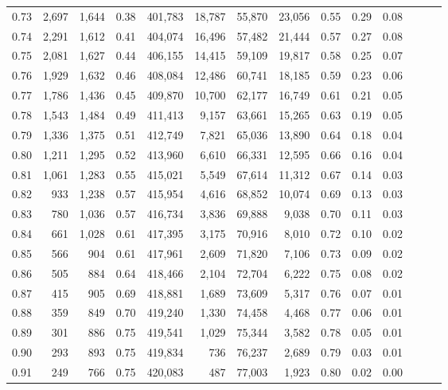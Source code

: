 \begin{tabular}{rrrrrrrrrrrrrr}
0.73 &  2,697 &  1,644 &  0.38 &  401,783 &   18,787 &  55,870 &  23,056 &  0.55 &  0.29 &      0.08 \\
0.74 &  2,291 &  1,612 &  0.41 &  404,074 &   16,496 &  57,482 &  21,444 &  0.57 &  0.27 &      0.08 \\
0.75 &  2,081 &  1,627 &  0.44 &  406,155 &   14,415 &  59,109 &  19,817 &  0.58 &  0.25 &      0.07 \\
0.76 &  1,929 &  1,632 &  0.46 &  408,084 &   12,486 &  60,741 &  18,185 &  0.59 &  0.23 &      0.06 \\
0.77 &  1,786 &  1,436 &  0.45 &  409,870 &   10,700 &  62,177 &  16,749 &  0.61 &  0.21 &      0.05 \\
0.78 &  1,543 &  1,484 &  0.49 &  411,413 &    9,157 &  63,661 &  15,265 &  0.63 &  0.19 &      0.05 \\
0.79 &  1,336 &  1,375 &  0.51 &  412,749 &    7,821 &  65,036 &  13,890 &  0.64 &  0.18 &      0.04 \\
0.80 &  1,211 &  1,295 &  0.52 &  413,960 &    6,610 &  66,331 &  12,595 &  0.66 &  0.16 &      0.04 \\
0.81 &  1,061 &  1,283 &  0.55 &  415,021 &    5,549 &  67,614 &  11,312 &  0.67 &  0.14 &      0.03 \\
0.82 &    933 &  1,238 &  0.57 &  415,954 &    4,616 &  68,852 &  10,074 &  0.69 &  0.13 &      0.03 \\
0.83 &    780 &  1,036 &  0.57 &  416,734 &    3,836 &  69,888 &   9,038 &  0.70 &  0.11 &      0.03 \\
0.84 &    661 &  1,028 &  0.61 &  417,395 &    3,175 &  70,916 &   8,010 &  0.72 &  0.10 &      0.02 \\
0.85 &    566 &    904 &  0.61 &  417,961 &    2,609 &  71,820 &   7,106 &  0.73 &  0.09 &      0.02 \\
0.86 &    505 &    884 &  0.64 &  418,466 &    2,104 &  72,704 &   6,222 &  0.75 &  0.08 &      0.02 \\
0.87 &    415 &    905 &  0.69 &  418,881 &    1,689 &  73,609 &   5,317 &  0.76 &  0.07 &      0.01 \\
0.88 &    359 &    849 &  0.70 &  419,240 &    1,330 &  74,458 &   4,468 &  0.77 &  0.06 &      0.01 \\
0.89 &    301 &    886 &  0.75 &  419,541 &    1,029 &  75,344 &   3,582 &  0.78 &  0.05 &      0.01 \\
0.90 &    293 &    893 &  0.75 &  419,834 &      736 &  76,237 &   2,689 &  0.79 &  0.03 &      0.01 \\
0.91 &    249 &    766 &  0.75 &  420,083 &      487 &  77,003 &   1,923 &  0.80 &  0.02 &      0.00 \\

\end{tabular}
